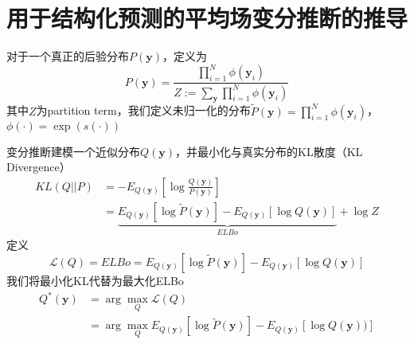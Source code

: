 \chapter{用于结构化预测的平均场变分推断的推导}
\label{cha:mfvi-derivation}
对于一个真正的后验分布$P(\boldsymbol{y})$，定义为
\begin{equation}\label{eq:posterior}
    P(\boldsymbol{y}) =\frac{\prod_{i=1}^{N} \phi(\boldsymbol{y}_i)}{Z:=\sum_{\boldsymbol{y}}\prod_{i=1}^{N} \phi(\boldsymbol{y}_i)}
\end{equation}
其中$Z$为partition term，我们定义未归一化的分布$\tilde{P}(\boldsymbol{y})=\prod_{i=1}^{N} \phi(\boldsymbol{y}_i)$，$\phi(\cdot)=\exp(s(\cdot))$

变分推断建模一个近似分布$Q(\boldsymbol{y})$，并最小化与真实分布的KL散度（KL Divergence）
\begin{equation}
    \begin{split}
        KL(Q||P)
        &=-E_{Q(\boldsymbol{y})}\left[\log\frac{Q(\boldsymbol{y})}{P(\boldsymbol{y})}\right]\\
        &=\underbrace{E_{Q(\boldsymbol{y})}\left[\log \tilde{P}(\boldsymbol{y})\right]-E_{Q(\boldsymbol{y})}\left[\log Q(\boldsymbol{y})\right]}_{ELBo}+\log Z
    \end{split}
\end{equation}
定义
\begin{equation}
    \mathcal{L}(Q)=ELBo=E_{Q(\boldsymbol{y})}\left[\log \tilde{P}(\boldsymbol{y})\right]-E_{Q(\boldsymbol{y})}\left[\log Q(\boldsymbol{y})\right]
\end{equation}
我们将最小化KL代替为最大化ELBo
\begin{equation}
    \begin{split}
        Q^{\ast}(\boldsymbol{y}) &= \arg\max_{Q}\mathcal{L}(Q)\\
        &= \arg\max_{Q}E_{Q(\boldsymbol{y})}\left[\log \tilde{P}(\boldsymbol{y})\right]-E_{Q(\boldsymbol{y})}\left[\log Q(\boldsymbol{y}))\right]
    \end{split}
\end{equation}



